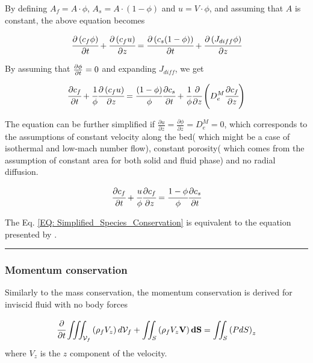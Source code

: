 \documentclass[../Article_Model_Parameters.tex]{subfiles}
\begin{document}
	By defining $A_f = A \cdot \phi$, $A_s = A \cdot \left( 1-\phi \right)$ and $u=V \cdot \phi$, and assuming that $A$ is constant, the above equation becomes
	
	{\footnotesize
		\begin{equation}
			\cfrac{\partial \left( c_f \phi \right)}{\partial t} + \cfrac{\partial \left( c_f u\right)}{\partial z} = \cfrac{\partial \left( c_s (1-\phi) \right) }{\partial t} + \cfrac{\partial \left( J_{diff} \phi \right) }{\partial z}
		\end{equation}
	}

	By assuming that ${\footnotesize \frac{\partial \phi}{\partial t}=0}$ and expanding $J_{diff}$, we get
	
	{\footnotesize
		\begin{equation}
			\cfrac{\partial c_f}{\partial t} + \cfrac{1}{\phi} \cfrac{\partial \left( c_f u\right)}{\partial z} = \cfrac{ (1-\phi)}{\phi} \cfrac{\partial c_s }{\partial t} + \cfrac{1}{\phi} \cfrac{\partial}{\partial z} \left( D_e^M \cfrac{\partial c_f}{\partial z} \right)
		\end{equation}
	}
	
	The equation can be further simplified if $\frac{\partial u}{\partial z} = \frac{\partial \phi}{\partial z} = D_e^M = 0$, which corresponds to the assumptions of constant velocity along the bed( which might be a case of isothermal and low-mach number flow), constant porosity( which comes from the assumption of constant area for both solid and fluid phase) and no radial diffusion.
	
	{\footnotesize
		\begin{equation}
			\cfrac{\partial c_f}{\partial t} + \cfrac{u}{\phi} \cfrac{\partial c_f}{\partial z}  = \cfrac{1-\phi}{\phi} \cfrac{\partial c_s}{\partial t} 
			\label{EQ: Simplified_Species_Conservation}
		\end{equation}
	}

	The Eq. \ref{EQ: Simplified_Species_Conservation} is equivalent to the equation presented by \citet{Reverchon1996}.
	
	\hrule
	
	\subsubsection{Momentum conservation}
	
	Similarly to the mass conservation, the momentum conservation is derived for inviscid fluid with no body forces
	
	{\footnotesize
		\begin{equation}
			\cfrac{\partial}{\partial t} \iiint_{\mathcal{V}_f} \left( \rho_f V_z \right) d\mathcal{V}_f + \iint_S \left( \rho_f V_z \textbf{V} \right) \textbf{dS} = \iint_S \left( P dS \right)_z
			\label{EQ: Momentum_Integral_Form}
		\end{equation}
	}
	where $V_z$ is the $z$ component of the velocity.
\end{document}
